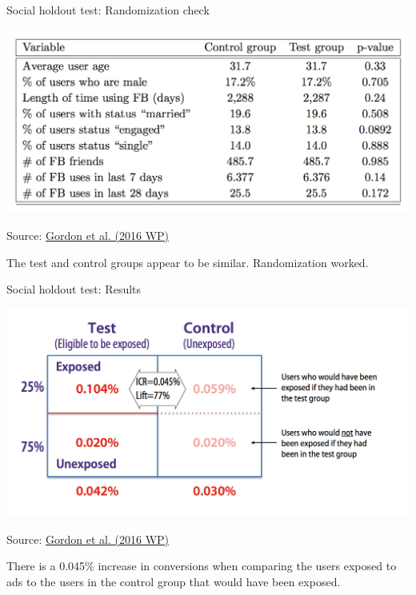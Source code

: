 \documentclass[10pt, aspectratio=169]{beamer}
\newcommand{\source}[1]{\begin{flushright} \footnotesize Source: {#1} \end{flushright} \normalsize}
\begin{document}
\begin{frame}{Social holdout test: Randomization check}
\begin{center}
\includegraphics[height=0.6\textheight]{images/gordonetalrandomizationcheck.png}\\
\source{\href{https://drive.google.com/uc?export=download&id=0B0EzanlzLNsWU1BkWnFxZlZuZUE}{Gordon et al. (2016 WP)}}
\alert{The test and control groups appear to be similar. Randomization worked.}
\end{center}
\end{frame}

\begin{frame}{Social holdout test: Results}
\begin{center}
\includegraphics[height=0.6\textheight]{images/gordonetalresult.png}\\
\end{center}
\source{\href{https://drive.google.com/uc?export=download&id=0B0EzanlzLNsWU1BkWnFxZlZuZUE}{Gordon et al. (2016 WP)}}
\alert{There is a 0.045\% increase in conversions when comparing the users exposed to ads to the users in the control group that would have been exposed.}
\end{frame}
\end{document}
